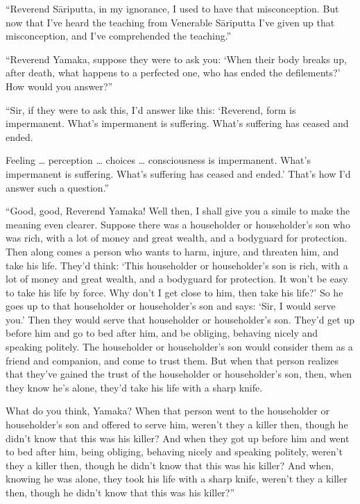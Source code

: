 \documentclass[12pt,openany]{book}%
\begin{document}
“Reverend \textsanskrit{Sāriputta}, in my ignorance, I used to have that misconception. But now that I’ve heard the teaching from Venerable \textsanskrit{Sāriputta} I’ve given up that misconception, and I’ve comprehended the teaching.” 

“Reverend Yamaka, suppose they were to ask you: ‘When their body breaks up, after death, what happens to a perfected one, who has ended the defilements?’ How would you answer?” 

“Sir, if they were to ask this, I’d answer like this: ‘Reverend, form is impermanent. What’s impermanent is suffering. What’s suffering has ceased and ended. 

Feeling … perception … choices … consciousness is impermanent. What’s impermanent is suffering. What’s suffering has ceased and ended.’ That’s how I’d answer such a question.” 

“Good, good, Reverend Yamaka! Well then, I shall give you a simile to make the meaning even clearer. Suppose there was a householder or householder’s son who was rich, with a lot of money and great wealth, and a bodyguard for protection. Then along comes a person who wants to harm, injure, and threaten him, and take his life. They’d think: ‘This householder or householder’s son is rich, with a lot of money and great wealth, and a bodyguard for protection. It won’t be easy to take his life by force. Why don’t I get close to him, then take his life?’ So he goes up to that householder or householder’s son and says: ‘Sir, I would serve you.’ Then they would serve that householder or householder’s son. They’d get up before him and go to bed after him, and be obliging, behaving nicely and speaking politely. The householder or householder’s son would consider them as a friend and companion, and come to trust them. But when that person realizes that they’ve gained the trust of the householder or householder’s son, then, when they know he’s alone, they’d take his life with a sharp knife. 

What do you think, Yamaka? When that person went to the householder or householder’s son and offered to serve him, weren’t they a killer then, though he didn’t know that this was his killer? And when they got up before him and went to bed after him, being obliging, behaving nicely and speaking politely, weren’t they a killer then, though he didn’t know that this was his killer? And when, knowing he was alone, they took his life with a sharp knife, weren’t they a killer then, though he didn’t know that this was his killer?” 
\end{document}
